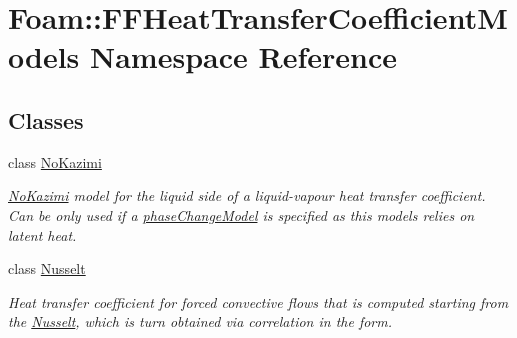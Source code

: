 \hypertarget{namespaceFoam_1_1FFHeatTransferCoefficientModels}{}\section{Foam\+:\+:F\+F\+Heat\+Transfer\+Coefficient\+Models Namespace Reference}
\label{namespaceFoam_1_1FFHeatTransferCoefficientModels}
\subsection*{Classes}
\begin{DoxyCompactItemize}
\item 
class \hyperlink{classFoam_1_1FFHeatTransferCoefficientModels_1_1NoKazimi}{No\+Kazimi}
\begin{DoxyCompactList}\small\item\em \hyperlink{classFoam_1_1FFHeatTransferCoefficientModels_1_1NoKazimi}{No\+Kazimi} model for the liquid side of a liquid-\/vapour heat transfer coefficient. Can be only used if a \hyperlink{classFoam_1_1phaseChangeModel}{phase\+Change\+Model} is specified as this models relies on latent heat. \end{DoxyCompactList}\item 
class \hyperlink{classFoam_1_1FFHeatTransferCoefficientModels_1_1Nusselt}{Nusselt}
\begin{DoxyCompactList}\small\item\em Heat transfer coefficient for forced convective flows that is computed starting from the \hyperlink{classFoam_1_1FFHeatTransferCoefficientModels_1_1Nusselt}{Nusselt}, which is turn obtained via correlation in the form. \end{DoxyCompactList}\end{DoxyCompactItemize}
